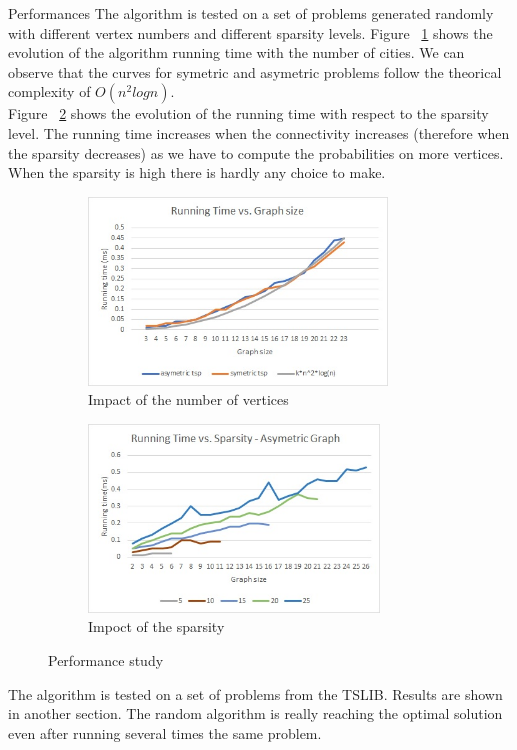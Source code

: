 \documentclass[../report.tex]{subfiles}
\begin{document}
\begin{subsection}{Performances}
The algorithm is tested on a set of problems generated randomly with different vertex numbers and different sparsity levels.
Figure ~\ref{fig:randomgraphsize} shows the evolution of the algorithm running time with the number of cities. We can observe that the curves for symetric and asymetric problems follow the theorical complexity of $O(n^2 log n)$. \\
Figure ~\ref{fig:randomsparsity} shows the evolution of the running time with respect to the sparsity level. The running time increases when the connectivity increases (therefore when the sparsity decreases) as we have to compute the probabilities on more vertices. When the sparsity is high there is hardly any choice to make.

\begin{figure}[H]
\centering
\begin{subfigure}{.5\textwidth}
\includegraphics[height=5cm,valign=t]{./Images/perf_random_graphsize.jpg}
\caption{Impact of the number of vertices \label{fig:randomgraphsize}}
\end{subfigure}%
\begin{subfigure}{.5\textwidth}
\includegraphics[height=5cm,valign=t]{./Images/perf_random_sparsity.jpg}
\caption{Impoct of the sparsity \label{fig:randomsparsity}}
\end{subfigure}%
\caption{Performance study \label{fig:randomperf}}
\end{figure}

The algorithm is tested on a set of problems from the TSLIB. Results are shown in another section. The random algorithm is really reaching the optimal solution even after running several times the same problem.


\end{subsection}
\end{document}
